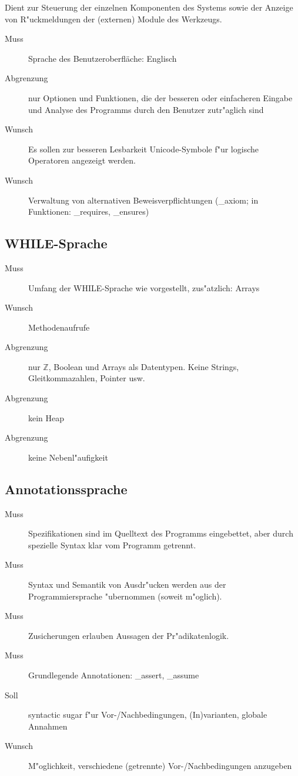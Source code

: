 Dient zur Steuerung der einzelnen Komponenten des Systems sowie der Anzeige von R"uckmeldungen der (externen) \see Module des Werkzeugs.%

\begin{description}%
    \item [Muss] Sprache des Benutzeroberfläche: Englisch%
    \item [Abgrenzung] nur Optionen und Funktionen, die der besseren oder einfacheren Eingabe und Analyse des Programms durch den Benutzer zutr"aglich sind%
    \item [Wunsch] Es sollen zur besseren Lesbarkeit \see Unicode-Symbole f"ur \see logische Operatoren angezeigt werden.%
    \item [Wunsch] Verwaltung von alternativen \see Beweisverpflichtungen (\_axiom; in Funktionen: \_requires, \_ensures)%
\end{description}%

\subsection{\see WHILE-Sprache}%

\begin{description}%
    \item [Muss] Umfang der WHILE-Sprache wie vorgestellt, zus"atzlich: Arrays%
    \item [Wunsch] Methodenaufrufe%
    \item [Abgrenzung] nur $\mathbb{Z}$, Boolean und Arrays als Datentypen. Keine Strings, Gleitkommazahlen, Pointer usw.%
    \item [Abgrenzung] kein \see Heap%
    \item [Abgrenzung] keine \see Nebenl"aufigkeit%
\end{description}%

\subsection{Annotationssprache}%

\begin{description}%
    \item [Muss] Spezifikationen sind im Quelltext des Programms eingebettet, aber durch spezielle Syntax klar vom Programm getrennt.%
    \item [Muss] Syntax und Semantik von Ausdr"ucken werden aus der Programmiersprache "ubernommen (soweit m"oglich).%
    \item [Muss] Zusicherungen erlauben Aussagen der \see Pr"adikatenlogik.%
    \item [Muss] Grundlegende Annotationen: \_assert, \_assume%
    \item [Soll] syntactic sugar f"ur \see Vor-/Nachbedingungen, \see (In)varianten, \see globale Annahmen%
    \item [Wunsch] M"oglichkeit, verschiedene (getrennte) Vor-/Nachbedingungen anzugeben%
\end{description}%

